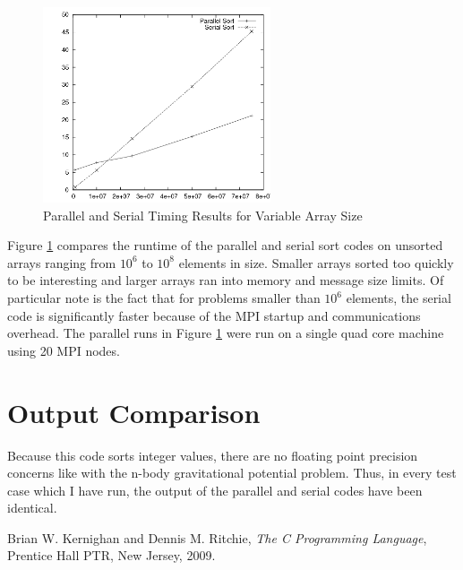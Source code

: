 \documentclass{article}
\begin{document}
\begin{figure}
\centering
\includegraphics[width=0.6\textwidth]{img/comparison1.png}
\caption{Parallel and Serial Timing Results for Variable Array Size}
\label{chart1}
\end{figure}

Figure \ref{chart1} compares the runtime of the parallel and serial sort codes on unsorted arrays ranging from \(10^6\) to \(10^8\) elements in size. Smaller arrays sorted too quickly to be interesting and larger arrays ran into memory and message size limits. Of particular note is the fact that for problems smaller than \(10^6\) elements, the serial code is significantly faster because of the MPI startup and communications overhead. The parallel runs in Figure \ref{chart1} were run on a single quad core machine using 20 MPI nodes.


\section{Output Comparison}
\label{outputcomp}

Because this code sorts integer values, there are no floating point precision concerns like with the n-body gravitational potential problem. Thus, in every test case which I have run, the output of the parallel and serial codes have been identical.

\begin{thebibliography}{9}

  Brian W. Kernighan and Dennis M. Ritchie,
  \emph{The C Programming Language},
  Prentice Hall PTR, New Jersey,
  2009.

\end{thebibliography}
\end{document}
